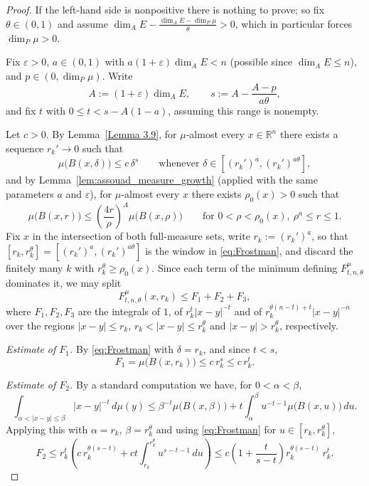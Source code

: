 \documentclass[10pt,a4paper]{amsart}
\begin{document}
\begin{proof}
If the left-hand side is
nonpositive there is nothing to prove; so fix $\theta\in(0,1)$ and
assume $\dim_A E-\frac{\dim_A E-\dim_P\mu}{\theta}>0$, which in
particular forces $\dim_P\mu>0$.

Fix $\varepsilon>0$, $a\in(0,1)$ with $a(1+\varepsilon)\dim_A E<n$
(possible since $\dim_A E\leq n$), and $p\in(0,\dim_P\mu)$. Write
$$A:=(1+\varepsilon)\dim_A E,\qquad
s:=A-\frac{A-p}{a\theta},$$
and fix $t$ with $0\leq t<s-A(1-a)$, assuming this range is nonempty.

Let $c>0$. By Lemma~\ref{Lemma 3.9}, for $\mu$-almost every
$x\in\mathbb{R}^n$ there exists a sequence $r_k'\to 0$ such that
\begin{equation}\label{eq:Frostman}
\mu\bigl(B(x,\delta)\bigr)\leq c\,\delta^{s}
\qquad\text{whenever }\delta\in[(r_k')^{a},(r_k')^{a\theta}],
\end{equation}
and by Lemma~\ref{lem:assouad_measure_growth} (applied with the same
parameters $a$ and $\varepsilon$), for $\mu$-almost every $x$ there
exists $\rho_0(x)>0$ such that
\begin{equation}\label{eq:growth}
\mu\bigl(B(x,r)\bigr)\leq\left(\frac{4r}{\rho}\right)^{A}
\mu\bigl(B(x,\rho)\bigr)
\qquad\text{for }0<\rho<\rho_0(x),\ \rho^{a}\leq r\leq 1.
\end{equation}
Fix $x$ in the intersection of both full-measure sets, write
$r_k:=(r_k')^{a}$, so that $[r_k,r_k^{\theta}]=[(r_k')^a,(r_k')^{a\theta}]$
is the window in \eqref{eq:Frostman}, and discard the finitely many $k$
with $r_k^{\theta}\geq\rho_0(x)$. Since each term of the minimum
defining $F_{t,n,\theta}^{\mu}$ dominates it, we may split
$$F_{t,n,\theta}^{\mu}(x,r_k)\leq F_1+F_2+F_3,$$
where $F_1,F_2,F_3$ are the integrals of $1$, of $r_k^t|x-y|^{-t}$ and
of $r_k^{\theta(n-t)+t}|x-y|^{-n}$ over the regions $|x-y|\leq r_k$,
$r_k<|x-y|\leq r_k^{\theta}$ and $|x-y|>r_k^{\theta}$, respectively.

\emph{Estimate of $F_1$.} By \eqref{eq:Frostman} with $\delta=r_k$, and
since $t<s$,
$$F_1=\mu\bigl(B(x,r_k)\bigr)\leq c\,r_k^{s}\leq c\,r_k^{t}.$$

\emph{Estimate of $F_2$.} By a standard computation we have,
for $0<\alpha<\beta$,
$$\int_{\alpha<|x-y|\leq\beta}|x-y|^{-t}\,d\mu(y)
\leq \beta^{-t}\mu\bigl(B(x,\beta)\bigr)
+t\int_{\alpha}^{\beta}u^{-t-1}\mu\bigl(B(x,u)\bigr)\,du.$$
Applying this with $\alpha=r_k$, $\beta=r_k^{\theta}$ and using
\eqref{eq:Frostman} for $u\in[r_k,r_k^{\theta}]$,
$$F_2\leq r_k^{t}\left(c\,r_k^{\theta(s-t)}
+ct\int_{r_k}^{r_k^{\theta}}u^{s-t-1}\,du\right)
\leq c\left(1+\frac{t}{s-t}\right)r_k^{\theta(s-t)}\,r_k^{t}.$$


\end{proof}
\end{document}
